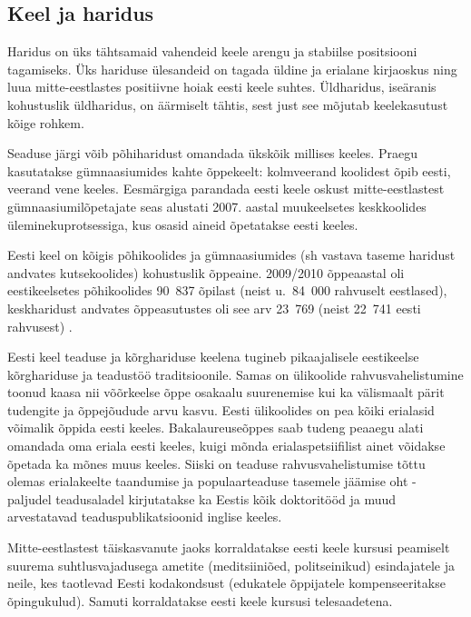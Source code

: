 \begin{multicols}{2}
\subsection{Keel ja haridus}

Haridus on üks tähtsamaid vahendeid keele arengu ja stabiilse positsiooni tagamiseks.  Üks hariduse ülesandeid on tagada üldine ja erialane kirjaoskus ning luua mitte-eestlastes positiivne hoiak eesti keele suhtes.  Üldharidus, iseäranis kohustuslik üldharidus, on äärmiselt tähtis, sest just see mõjutab keelekasutust kõige rohkem.
 
Seaduse järgi võib põhiharidust omandada ükskõik millises keeles.  Praegu kasutatakse gümnaasiumides kahte õppekeelt: kolmveerand koolidest õpib eesti, veerand vene keeles.  Eesmärgiga parandada eesti keele oskust mitte-eestlastest gümnaasiumilõpetajate seas alustati 2007. aastal muukeelsetes keskkoolides üleminekuprotsessiga, kus osasid aineid õpetatakse eesti keeles.

Eesti keel on kõigis põhikoolides ja gümnaasiumides (sh vastava taseme haridust andvates kutsekoolides) kohustuslik õppeaine.  2009/2010 õppeaastal oli eestikeelsetes põhikoolides 90~837 õpilast (neist u.~84~000 rahvuselt eestlased), keskharidust andvates õppeasutustes oli see arv 23~769 (neist 22~741 eesti rahvusest) \cite{DevPlan}.


Eesti keel teaduse ja kõrghariduse keelena tugineb pikaajalisele eestikeelse kõrghariduse ja teadustöö traditsioonile.  Samas on ülikoolide rahvusvahelistumine toonud kaasa nii võõrkeelse õppe osakaalu suurenemise kui ka välismaalt pärit tudengite ja õppejõudude arvu kasvu.  Eesti ülikoolides on pea kõiki erialasid võimalik õppida eesti keeles.  Bakalaureuseõppes saab tudeng peaaegu alati omandada oma eriala eesti keeles, kuigi mõnda erialaspetsiifilist ainet võidakse õpetada ka mõnes muus keeles.  Siiski on teaduse rahvusvahelistumise tõttu olemas erialakeelte taandumise ja populaarteaduse tasemele jäämise oht - paljudel teadusaladel kirjutatakse ka Eestis kõik doktoritööd ja muud arvestatavad teaduspublikatsioonid inglise keeles.
   
Mitte-eestlastest täiskasvanute jaoks kor\-ral\-datakse eesti keele kursusi peamiselt suu\-rema suhtlusvajadusega ametite (medit\-siini\-õed, politseinikud) esindajatele ja neile, kes taotlevad Eesti kodakondsust (edukatele õppijatele kompenseeritakse õpingukulud).  Samuti korraldatakse eesti keele kursusi telesaadetena.
 

\end{multicols}
